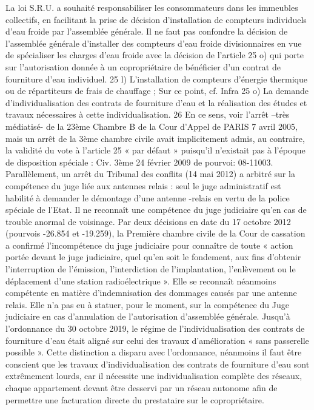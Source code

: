 \begin{list}{}{}
					La loi S.R.U. a souhaité responsabiliser les consommateurs dans les immeubles collectifs, en facilitant la prise de décision d’installation de compteurs individuels d’eau froide par l'assemblée générale.
					Il ne faut pas confondre la décision de l’assemblée générale d’installer des compteurs d’eau froide divisionnaires en vue de spécialiser les charges d’eau froide avec la décision de l’article 25 o) qui porte sur l’autorisation donnée à un copropriétaire de bénéficier d’un contrat de fourniture d’eau individuel.
					25 l) L'installation de compteurs d'énergie thermique ou de répartiteurs de frais de chauffage ; Sur ce point, cf. Infra
					25 o) La demande d'individualisation des contrats de fourniture d'eau et la réalisation des études et travaux nécessaires à cette individualisation.
					26 En ce sens, voir l’arrêt –très médiatisé- de la 23ème Chambre B de la Cour d’Appel de PARIS 7 avril 2005, mais un arrêt de la 3ème chambre civile avait implicitement admis, au contraire, la validité du vote à l’article 25 « par défaut » puisqu’il n’existait pas à l’époque de disposition spéciale : Civ. 3ème 24 février 2009 \no de pourvoi: 08-11003.
					Parallèlement, un arrêt du Tribunal des conflits (14 mai 2012) a arbitré sur la compétence du juge liée aux antennes relais : seul le juge administratif est habilité à demander le démontage d’une antenne -relais en vertu de la police spéciale de l’Etat. Il ne reconnaît une compétence du juge judiciaire qu’en cas de trouble anormal de voisinage. Par deux décisions en date du 17 octobre 2012 (pourvois -26.854 et -19.259), la Première chambre civile de la Cour de cassation a confirmé l’incompétence du juge judiciaire pour connaître de toute « action portée devant le juge judiciaire, quel qu’en soit le fondement, aux fins d’obtenir l’interruption de l’émission, l’interdiction de l’implantation, l’enlèvement ou le déplacement d’une station radioélectrique ». Elle se reconnaît néanmoins compétente en matière d’indemnisation des dommages causés par une antenne relais. Elle n’a pas eu à statuer, pour le moment, sur la compétence du Juge judiciaire en cas d’annulation de l’autorisation d’assemblée générale.
					Jusqu’à l’ordonnance du 30 octobre 2019, le régime de l’individualisation des contrats de fourniture d’eau était aligné sur celui des travaux d’amélioration « sans passerelle possible ». Cette distinction a disparu avec l’ordonnance, néanmoins il faut être conscient que les travaux d’individualisation des contrats de fourniture d’eau sont extrêmement lourds, car il nécessite une individualisation complète des réseaux, chaque appartement devant être desservi par un réseau autonome afin de permettre une facturation directe du prestataire sur le copropriétaire.
				\end{list}
	

